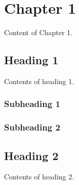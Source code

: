 \section{Chapter 1}
Content of Chapter 1.

\subsection{Heading 1}
Contents of heading 1.

\subsubsection{Subheading 1}
\subsubsection{Subheading 2}

\subsection{Heading 2}
Contents of heading 2.
